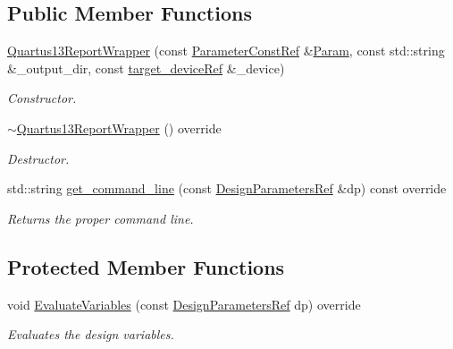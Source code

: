 \subsection*{Public Member Functions}
\begin{DoxyCompactItemize}
\item 
\hyperlink{classQuartus13ReportWrapper_a3a425105ef70ba5ad1d78ab9f6e2538b}{Quartus13\+Report\+Wrapper} (const \hyperlink{Parameter_8hpp_a37841774a6fcb479b597fdf8955eb4ea}{Parameter\+Const\+Ref} \&\hyperlink{classSynthesisTool_a854ef102782ff4d069e1aa6d1a94d64e}{Param}, const std\+::string \&\+\_\+output\+\_\+dir, const \hyperlink{target__device_8hpp_acedb2b7a617e27e6354a8049fee44eda}{target\+\_\+device\+Ref} \&\+\_\+device)
\begin{DoxyCompactList}\small\item\em Constructor. \end{DoxyCompactList}\item 
\hyperlink{classQuartus13ReportWrapper_a1747b7328bd537869aa4eb4a9d4c4ad7}{$\sim$\+Quartus13\+Report\+Wrapper} () override
\begin{DoxyCompactList}\small\item\em Destructor. \end{DoxyCompactList}\item 
std\+::string \hyperlink{classQuartus13ReportWrapper_a3497e8b5f3941355beb7c64ee771b5ff}{get\+\_\+command\+\_\+line} (const \hyperlink{DesignParameters_8hpp_ae36bb1c4c9150d0eeecfe1f96f42d157}{Design\+Parameters\+Ref} \&dp) const override
\begin{DoxyCompactList}\small\item\em Returns the proper command line. \end{DoxyCompactList}\end{DoxyCompactItemize}
\subsection*{Protected Member Functions}
\begin{DoxyCompactItemize}
\item 
void \hyperlink{classQuartus13ReportWrapper_af36c7735f63c651ab56d49e6cb620310}{Evaluate\+Variables} (const \hyperlink{DesignParameters_8hpp_ae36bb1c4c9150d0eeecfe1f96f42d157}{Design\+Parameters\+Ref} dp) override
\begin{DoxyCompactList}\small\item\em Evaluates the design variables. \end{DoxyCompactList}\end{DoxyCompactItemize}
